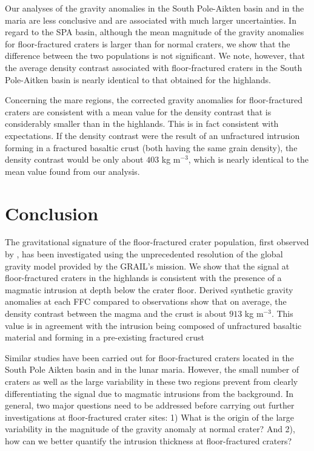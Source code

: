 Our analyses of  the gravity anomalies in the  South Pole-Aikten basin
and in  the maria  are less  conclusive and  are associated  with much
larger uncertainties.  In  regard to the SPA basin,  although the mean
magnitude  of the  gravity  anomalies for  floor-fractured craters  is
larger than  for normal craters,  we show that the  difference between
the two  populations is not  significant.  We note, however,  that the
average density  contrast associated  with floor-fractured  craters in
the South Pole-Aitken  basin is nearly identical to  that obtained for
the highlands.

Concerning  the  mare regions,  the  corrected  gravity anomalies  for
floor-fractured  craters are  consistent  with a  mean  value for  the
density contrast that  is considerably smaller than  in the highlands.
This is in fact consistent with expectations.  If the density contrast
were the  result of  an unfractured intrusion  forming in  a fractured
basaltic  crust (both  having  the same  grain  density), the  density
contrast  would be  only  about  $403$ kg  m$^{-3}$,  which is  nearly
identical to the mean value found from our analysis.

\section{Conclusion}
\label{sec:conclusion}

The gravitational signature of  the floor-fractured crater population,
first observed by \citet{Schultz:1976kt},  has been investigated using
the unprecedented resolution  of the global gravity  model provided by
the  GRAIL's mission.   We  show that  the  signal at  floor-fractured
craters in the highlands is consistent with the presence of a magmatic
intrusion at depth below the  crater floor.  Derived synthetic gravity
anomalies at each  FFC compared to observations show  that on average,
the density contrast between the magma and the crust is about $913$ kg
m$^{-3}$. This value is in agreement with the intrusion being composed
of  unfractured  basaltic  material  and  forming  in  a  pre-existing
fractured crust \citep{Wieczorek:2013ipa}

Similar  studies have  been  carried out  for floor-fractured  craters
located  in the  South  Pole  Aikten basin  and  in  the lunar  maria.
However, the small number of craters  as well as the large variability
in these two  regions prevent from clearly  differentiating the signal
due to magmatic intrusions from the background.  In general, two major
questions   need  to   be  addressed   before  carrying   out  further
investigations at floor-fractured crater sites:  1) What is the origin
of the  large variability in the  magnitude of the gravity  anomaly at
normal  crater? And  2),  how  can we  better  quantify the  intrusion
thickness at floor-fractured craters?

